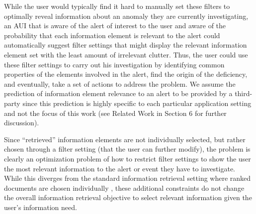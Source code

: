 While the user would typically find it hard to manually set these
filters to optimally reveal information about an anomaly they are
currently investigating, an AUI that is aware of the alert of interest
to the user and aware of the probability that each information element
is relevant to the alert could automatically suggest filter settings
that might display the relevant information element set with the least
amount of irrelevant clutter. Thus, the user could use these filter settings to carry out his investigation by identifying common properties of the elements involved in the alert, find the origin of the deficiency, and eventually, take a set of actions to address the problem.
We assume the prediction of information element relevance to an alert
to be provided by a third-party since this prediction is highly specific
to each particular application setting and not the focus of this work (see Related Work in Section 6 for further discussion). 

Since \textquotedblleft retrieved\textquotedblright{} information
elements are not individually selected, but rather chosen through
a filter setting (that the user can further modify), the problem is clearly 
an optimization problem of how to restrict filter settings to show
the user the most relevant information to the alert or event they have to investigate.
While this diverges from the standard information retrieval setting
where ranked documents are chosen individually \cite{Baeza-Yates2010}, these additional constraints
do not change the overall information retrieval objective to select
relevant information given the user\textquoteright s information need. 

